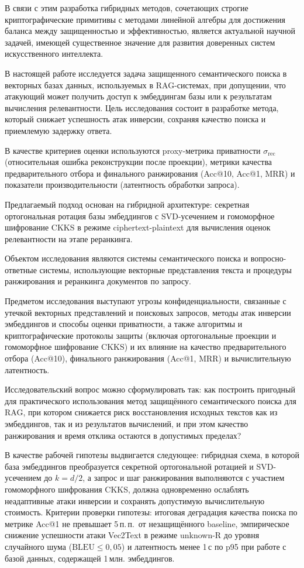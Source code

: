 \documentclass[a4paper, 12pt, oneside, openany]{article}
\begin{document}
В связи с этим разработка гибридных методов, сочетающих строгие криптографические примитивы с методами линейной алгебры для достижения баланса между защищенностью и эффективностью, является актуальной научной задачей, имеющей существенное значение для развития доверенных систем искусственного интеллекта.

В настоящей работе исследуется задача защищенного семантического поиска в векторных базах данных, используемых в RAG-системах, при допущении, что атакующий может получить доступ к эмбеддингам базы или к результатам вычисления релевантности. Цель исследования состоит в разработке метода, который снижает успешность атак инверсии, сохраняя качество поиска и приемлемую задержку ответа.

В качестве критериев оценки используются proxy-метрика приватности \(\sigma_{\mathrm{rec}}\) (относительная ошибка реконструкции после проекции), метрики качества предварительного отбора и финального ранжирования (Acc@10, Acc@1, MRR) и показатели производительности (латентность обработки запроса).

Предлагаемый подход основан на гибридной архитектуре: секретная ортогональная ротация базы эмбеддингов с SVD-усечением и гомоморфное шифрование CKKS в режиме ciphertext-plaintext для вычисления оценок релевантности на этапе реранкинга.

Объектом исследования являются системы семантического поиска и вопросно-ответные системы, использующие векторные представления текста и процедуры ранжирования и реранкинга документов по запросу.

Предметом исследования выступают угрозы конфиденциальности, связанные с утечкой векторных представлений и поисковых запросов, методы атак инверсии эмбеддингов и способы оценки приватности, а также алгоритмы и криптографические протоколы защиты (включая ортогональные проекции и гомоморфное шифрование CKKS) и их влияние на качество предварительного отбора (Acc@10), финального ранжирования (Acc@1, MRR) и вычислительную латентность.

Исследовательский вопрос можно сформулировать так: как построить пригодный для практического использования метод защищённого семантического поиска для RAG, при котором снижается риск восстановления исходных текстов как из эмбеддингов, так и из результатов вычислений, и при этом качество ранжирования и время отклика остаются в допустимых пределах?

В качестве рабочей гипотезы выдвигается следующее: гибридная схема, в которой база эмбеддингов преобразуется секретной ортогональной ротацией и SVD-усечением до $k = d/2$, а запрос и шаг ранжирования выполняются с участием гомоморфного шифрования CKKS, должна одновременно ослаблять неадаптивные атаки инверсии и сохранять допустимую вычислительную стоимость. Критерии проверки гипотезы: итоговая деградация качества поиска по метрике Acc@1 не превышает 5\,п.\,п.\ от незащищённого baseline, эмпирическое снижение успешности атаки Vec2Text в режиме unknown-R до уровня случайного шума ($\mathrm{BLEU} \leq 0{,}05$) и латентность менее 1\,с по p95 при работе с базой данных, содержащей 1\,млн. эмбеддингов.
\end{document}
